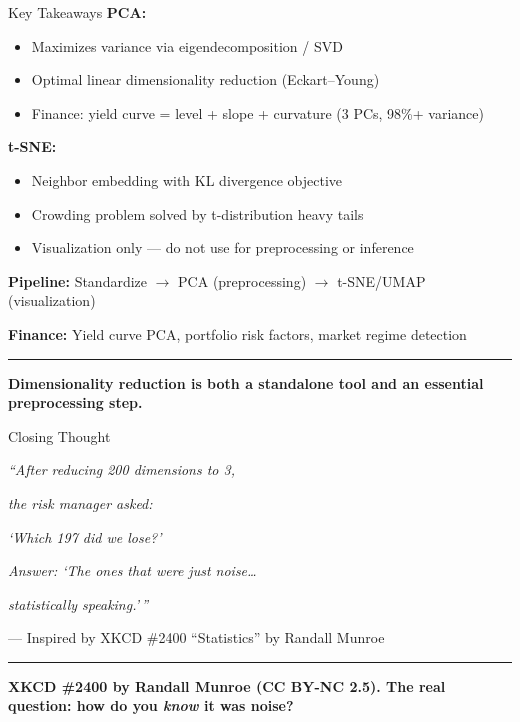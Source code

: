 \documentclass[8pt,aspectratio=169]{beamer}
\newcommand{\bottomnote}[1]{%
\vfill
\vspace{-2mm}
\textcolor{mllavender2}{\rule{\textwidth}{0.4pt}}
\vspace{1mm}
\footnotesize
\textbf{#1}
}
\begin{document}
\begin{frame}[t]{Key Takeaways}
\textbf{PCA:}
\begin{itemize}
  \item Maximizes variance via eigendecomposition / SVD
  \item Optimal linear dimensionality reduction (Eckart--Young)
  \item Finance: yield curve = level + slope + curvature (3 PCs, 98\%+ variance)
\end{itemize}

\vspace{0.3em}
\textbf{t-SNE:}
\begin{itemize}
  \item Neighbor embedding with KL divergence objective
  \item Crowding problem solved by t-distribution heavy tails
  \item Visualization only --- do not use for preprocessing or inference
\end{itemize}

\vspace{0.3em}
\textbf{Pipeline:} Standardize $\rightarrow$ PCA (preprocessing) $\rightarrow$ t-SNE/UMAP (visualization)

\textbf{Finance:} Yield curve PCA, portfolio risk factors, market regime detection
\bottomnote{Dimensionality reduction is both a standalone tool and an essential preprocessing step.}
\end{frame}

\begin{frame}[t]{Closing Thought}
\begin{center}
\Large
\textit{``After reducing 200 dimensions to 3,}

\textit{the risk manager asked:}

\textit{`Which 197 did we lose?'}

\vspace{0.5em}

\textit{Answer: `The ones that were just noise\ldots}

\textit{statistically speaking.'\,''}
\end{center}

\vspace{0.5em}
\begin{center}
\normalsize
--- Inspired by XKCD \#2400 ``Statistics'' by Randall Munroe
\end{center}
\bottomnote{XKCD \#2400 by Randall Munroe (CC BY-NC 2.5). The real question: how do you \textit{know} it was noise?}
\end{frame}
\end{document}
